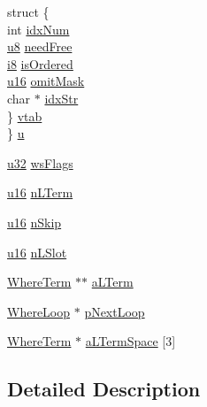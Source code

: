 \begin{DoxyCompactItemize}
\begin{tabbing}
\>struct \{\\
\>\>int \hyperlink{struct_where_loop_afaf2ebd5db0e0ccaccbcf4e3a7391f58}{idxNum}\\
\>\>\hyperlink{sqlite3_8c_a74a0f6424ae628af25f23f0a35f6ead3}{u8} \hyperlink{struct_where_loop_abfb567fa5c6bb71af5013374caef49f7}{needFree}\\
\>\>\hyperlink{sqlite3_8c_ad11a1324ecade336dc6ce17a20cf6617}{i8} \hyperlink{struct_where_loop_af9174dc8e7056e94c539611eeb036d8d}{isOrdered}\\
\>\>\hyperlink{sqlite3_8c_a20f2299e322dcbde37cb07b16910b843}{u16} \hyperlink{struct_where_loop_a9d044d3e695a6ffad60ed9479a7215be}{omitMask}\\
\>\>char $\ast$ \hyperlink{struct_where_loop_ad3aa8f088bcb7185aecac4ee06eae981}{idxStr}\\
\>\} \hyperlink{struct_where_loop_a28837ab871613ee4238d75c29ba0fb73}{vtab}\\
\} \hyperlink{struct_where_loop_a4b7109c9afc6317a714fc4748de1b95a}{u}\\

\end{tabbing}\item 
\hyperlink{sqlite3_8c_a03ad5adfaeb9b7640dde78a0cc390319}{u32} \hyperlink{struct_where_loop_a105a3ce7af3fa19f43535221c8514754}{ws\+Flags}
\item 
\hyperlink{sqlite3_8c_a20f2299e322dcbde37cb07b16910b843}{u16} \hyperlink{struct_where_loop_a7acee2f8f328bc00604d8e56ee00c676}{n\+L\+Term}
\item 
\hyperlink{sqlite3_8c_a20f2299e322dcbde37cb07b16910b843}{u16} \hyperlink{struct_where_loop_a1e39909a6ad648d48569605ae0d1700a}{n\+Skip}
\item 
\hyperlink{sqlite3_8c_a20f2299e322dcbde37cb07b16910b843}{u16} \hyperlink{struct_where_loop_aab25f364e6db92315e55905530d1024d}{n\+L\+Slot}
\item 
\hyperlink{struct_where_term}{Where\+Term} $\ast$$\ast$ \hyperlink{struct_where_loop_aa04716e525cd822b2a4c83d77f0010ad}{a\+L\+Term}
\item 
\hyperlink{struct_where_loop}{Where\+Loop} $\ast$ \hyperlink{struct_where_loop_a5dbc670d4951c6bbab7470ab07fd2d3c}{p\+Next\+Loop}
\item 
\hyperlink{struct_where_term}{Where\+Term} $\ast$ \hyperlink{struct_where_loop_abaf434cde5deb06833550415691f5444}{a\+L\+Term\+Space} \mbox{[}3\mbox{]}
\end{DoxyCompactItemize}


\subsection{Detailed Description}


